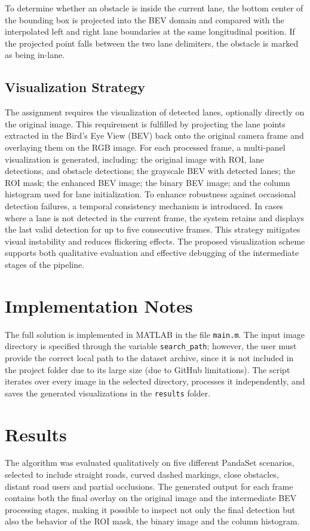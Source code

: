 \documentclass[conference]{IEEEtran}
\begin{document}
To determine whether an obstacle is inside the current lane, the bottom center of the bounding box is projected into the BEV domain and compared with the interpolated left and right lane boundaries at the same longitudinal position. If the projected point falls between the two lane delimiters, the obstacle is marked as being in-lane.

\subsection{Visualization Strategy}
The assignment requires the visualization of detected lanes, optionally directly on the original image. This requirement is fulfilled by projecting the lane points extracted in the Bird’s Eye View (BEV) back onto the original camera frame and overlaying them on the RGB image.
For each processed frame, a multi-panel visualization is generated, including: the original image with ROI, lane detections, and obstacle detections; the grayscale BEV with detected lanes; the ROI mask; the enhanced BEV image; the binary BEV image; and the column histogram used for lane initialization.
To enhance robustness against occasional detection failures, a temporal consistency mechanism is introduced. In cases where a lane is not detected in the current frame, the system retains and displays the last valid detection for up to five consecutive frames. This strategy mitigates visual instability and reduces flickering effects.
The proposed visualization scheme supports both qualitative evaluation and effective debugging of the intermediate stages of the pipeline.


\section{Implementation Notes}
The full solution is implemented in MATLAB in the file \texttt{main.m}. The input image directory is specified through the variable \texttt{search\_path}; however, the user must provide the correct local path to the dataset archive, since it is not included in the project folder due to its large size (due to GitHub limitations). The script iterates over every image in the selected directory, processes it independently, and saves the generated visualizations in the \texttt{results} folder.

\section{Results}
The algorithm was evaluated qualitatively on five different PandaSet scenarios, selected to include straight roads, curved dashed markings, close obstacles, distant road users and partial occlusions. The generated output for each frame contains both the final overlay on the original image and the intermediate BEV processing stages, making it possible to inspect not only the final detection but also the behavior of the ROI mask, the binary image and the column histogram.
\end{document}
